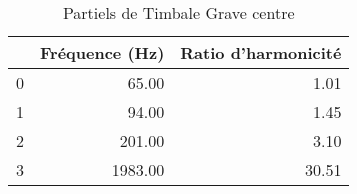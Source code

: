 \begin{table}
\centering
\caption{Partiels de Timbale Grave centre}
\label{table:partiels-timbale-grave-4.wav}
\begin{tabular}{lrr}
\toprule
{} &  Fréquence (Hz) &  Ratio d'harmonicité \\
\midrule
0 &           65.00 &                 1.01 \\
1 &           94.00 &                 1.45 \\
2 &          201.00 &                 3.10 \\
3 &         1983.00 &                30.51 \\
\bottomrule
\end{tabular}
\end{table}
